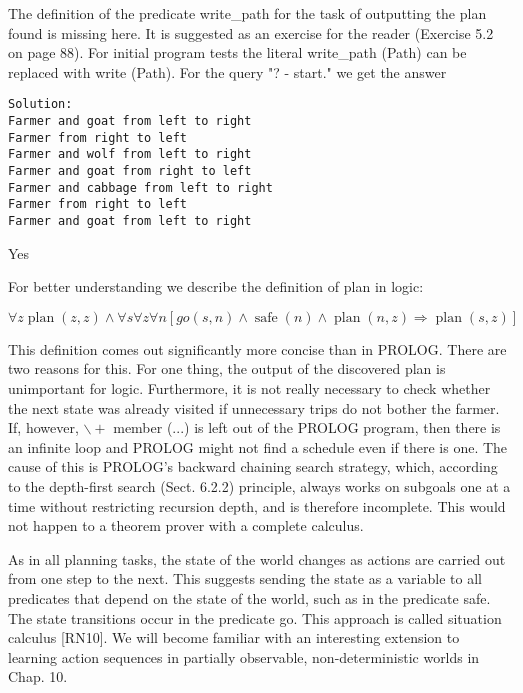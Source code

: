\documentclass[10pt]{article}
\begin{document}
The definition of the predicate write\_path for the task of outputting the plan found is missing here. It is suggested as an exercise for the reader (Exercise 5.2 on page 88). For initial program tests the literal write\_path (Path) can be replaced with write (Path). For the query "? - start." we get the answer

\begin{verbatim}
Solution:
Farmer and goat from left to right
Farmer from right to left
Farmer and wolf from left to right
Farmer and goat from right to left
Farmer and cabbage from left to right
Farmer from right to left
Farmer and goat from left to right
\end{verbatim}

Yes

For better understanding we describe the definition of plan in logic:

$$
\forall z \operatorname{plan}(z, z) \wedge \forall s \forall z \forall n[g o(s, n) \wedge \operatorname{safe}(n) \wedge \operatorname{plan}(n, z) \Rightarrow \operatorname{plan}(s, z)]
$$

This definition comes out significantly more concise than in PROLOG. There are two reasons for this. For one thing, the output of the discovered plan is unimportant for logic. Furthermore, it is not really necessary to check whether the next state was already visited if unnecessary trips do not bother the farmer. If, however, $\backslash+$ member (...) is left out of the PROLOG program, then there is an infinite loop and PROLOG might not find a schedule even if there is one. The cause of this is PROLOG's backward chaining search strategy, which, according to the depth-first search (Sect. 6.2.2) principle, always works on subgoals one at a time without restricting recursion depth, and is therefore incomplete. This would not happen to a theorem prover with a complete calculus.

As in all planning tasks, the state of the world changes as actions are carried out from one step to the next. This suggests sending the state as a variable to all predicates that depend on the state of the world, such as in the predicate safe. The state transitions occur in the predicate go. This approach is called situation calculus [RN10]. We will become familiar with an interesting extension to learning action sequences in partially observable, non-deterministic worlds in Chap. 10.
\end{document}

